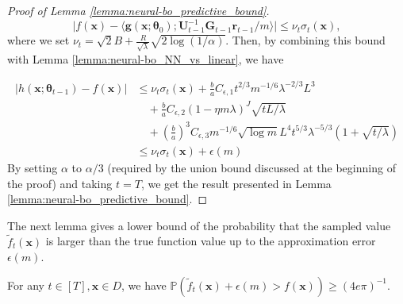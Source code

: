 \begin{proof}[Proof of Lemma \ref{lemma:neural-bo_predictive_bound}]
\[\rvert f(\mathbf{x}) - \langle \mathbf{g}(\mathbf{x}; \boldsymbol{\theta}_0); \mathbf{U}^{-1}_{t-1} \mathbf{G}_{t-1} \mathbf{r}_{t-1}/m \rangle \lvert \leq \nu_t \sigma_t (\mathbf{x}), 
\]
where we set $\nu_t = \sqrt{2}B + \frac{R}{\sqrt{\lambda}}\sqrt{2 \log(1/ \alpha)}$. 
Then, by combining this bound with
Lemma \ref{lemma:neural-bo_NN_vs_linear}, we have

\begin{equation*}
    \begin{split}
        \lvert h(\mathbf{x}; \boldsymbol{\theta}_{t-1}) - f(\mathbf{x}) \rvert & \leq \nu_t \sigma_t (\mathbf{x}) + \frac{b}{a} C_{\epsilon,1} t^{2/3}m^{-1/6} \lambda^{-2/3} L^3 \\ &
        \quad + \frac{b}{a} C_{\epsilon,2}(1 - \eta m \lambda)^J \sqrt{tL/\lambda} \\ &
        \quad +  \left(\frac{b}{a} \right)^3 C_{\epsilon,3} m^{-1/6} \sqrt{\log m} L^4 t^{5/3} \lambda ^{-5/3} \left(1 + \sqrt{t/\lambda}  \right) \\
        & \leq \nu_t \sigma_t (\mathbf{x}) + \epsilon(m)
    \end{split}
\end{equation*}
By setting $\alpha $ to $\alpha/3$ (required by the union bound discussed at the beginning of the proof) and taking $t=T$, we get the result presented in Lemma \ref{lemma:neural-bo_predictive_bound}.
\end{proof}

The next lemma gives a lower bound of the probability that the sampled value $\widetilde{f}_t (\mathbf{x})$ is larger than the true function value up to the approximation error $\epsilon(m)$.
\begin{lemma}
\label{lemma:neural-bo_sampled_value_vs_real_value}
For any $t \in [T], \mathbf{x} \in D$, we have $\mathbb{P}(\widetilde{f}_t (\mathbf{x}) + \epsilon(m) > f(\mathbf{x})) \geq (4e\pi)^{-1}$.
\end{lemma}

